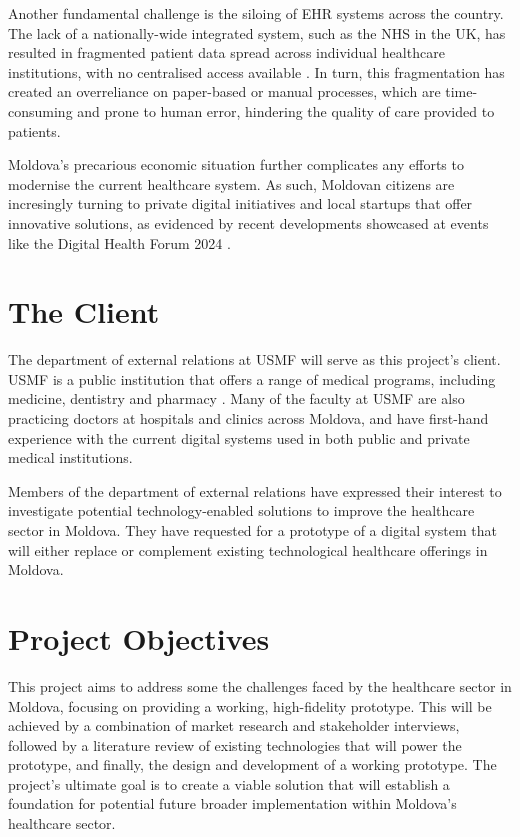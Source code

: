 Another fundamental challenge is the siloing of EHR systems across the country. The lack of a nationally-wide integrated system, such as the NHS in the UK, has resulted in fragmented patient data spread across individual healthcare institutions, with no centralised access available \parencite{mdehr}. In turn, this fragmentation has created an overreliance on paper-based or manual processes, which are time-consuming and prone to human error, hindering the quality of care provided to patients.

Moldova's precarious economic situation further complicates any efforts to modernise the current healthcare system. As such, Moldovan citizens are incresingly turning to private digital initiatives and local startups that offer innovative solutions, as evidenced by recent developments showcased at events like the Digital Health Forum 2024 \parencite{mdstartup}.

\section{The Client}

The department of external relations at USMF will serve as this project's client. USMF is a public institution that offers a range of medical programs, including medicine, dentistry and pharmacy \parencite{mduni}. Many of the faculty at USMF are also practicing doctors at hospitals and clinics across Moldova, and have first-hand experience with the current digital systems used in both public and private medical institutions.

Members of the department of external relations have expressed their interest to investigate potential technology-enabled solutions to improve the healthcare sector in Moldova. They have requested for a prototype of a digital system that will either replace or complement existing technological healthcare offerings in Moldova. 

\section{Project Objectives}\label{sec:objectives}

This project aims to address some the challenges faced by the healthcare sector in Moldova, focusing on providing a working, high-fidelity prototype. This will be achieved by a combination of market research and stakeholder interviews, followed by a literature review of existing technologies that will power the prototype, and finally, the design and development of a working prototype. The project's ultimate goal is to create a viable solution that will establish a foundation for potential future broader implementation within Moldova's healthcare sector.

